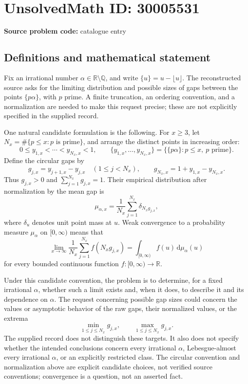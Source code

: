 \documentclass[11pt]{article}
\newcommand{\Q}{\mathbb{Q}}
\newcommand{\R}{\mathbb{R}}
\begin{document}
\section*{UnsolvedMath ID: 30005531}
\textbf{Source problem code:} catalogue entry
\subsection{Definitions and mathematical statement}
Fix an irrational number \(\alpha\in\R\setminus\Q\), and write \(\{u\}=u-\lfloor u\rfloor\). The reconstructed source asks for the limiting distribution and possible sizes of gaps between the points \(\{p\alpha\}\), with \(p\) prime. A finite truncation, an ordering convention, and a normalization are needed to make this request precise; these are not explicitly specified in the supplied record.

One natural candidate formulation is the following. For \(x\geq 3\), let \(N_x=\#\{p\leq x:p\text{ is prime}\}\), and arrange the distinct points in increasing order:
\[
0\leq y_{1,x}<\cdots<y_{N_x,x}<1,\qquad
\{y_{1,x},\ldots,y_{N_x,x}\}=\{\{p\alpha\}:p\leq x,\ p\text{ prime}\}.
\]
Define the circular gaps by
\[
g_{j,x}=y_{j+1,x}-y_{j,x}\quad(1\leq j<N_x),\qquad
g_{N_x,x}=1+y_{1,x}-y_{N_x,x}.
\]
Thus \(g_{j,x}>0\) and \(\sum_{j=1}^{N_x}g_{j,x}=1\). Their empirical distribution after normalization by the mean gap is
\[
\mu_{\alpha,x}=\frac{1}{N_x}\sum_{j=1}^{N_x}\delta_{N_xg_{j,x}},
\]
where \(\delta_u\) denotes unit point mass at \(u\). Weak convergence to a probability measure \(\mu_\alpha\) on \([0,\infty)\) means that
\[
\lim_{x\to\infty}\frac{1}{N_x}\sum_{j=1}^{N_x}f(N_xg_{j,x})
=\int_{[0,\infty)}f(u)\,\mathrm d\mu_\alpha(u)
\]
for every bounded continuous function \(f:[0,\infty)\to\R\).

Under this candidate convention, the problem is to determine, for a fixed irrational \(\alpha\), whether such a limit exists and, when it does, to describe it and its dependence on \(\alpha\). The request concerning possible gap sizes could concern the values or asymptotic behavior of the raw gaps, their normalized values, or the extrema
\[
\min_{1\leq j\leq N_x}g_{j,x},\qquad
\max_{1\leq j\leq N_x}g_{j,x}.
\]
The supplied record does not distinguish these targets. It also does not specify whether the intended conclusions concern every irrational \(\alpha\), Lebesgue-almost every irrational \(\alpha\), or an explicitly restricted class. The circular convention and normalization above are explicit candidate choices, not verified source conventions; convergence is a question, not an asserted fact.
\end{document}
